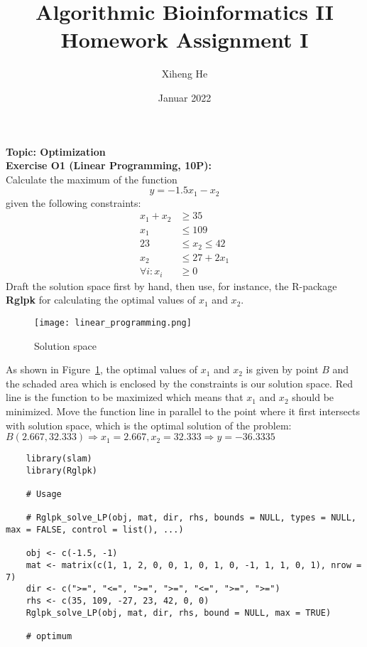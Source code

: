 \documentclass[12pt]{article}
\title{Algorithmic Bioinformatics II\\
Homework Assignment I}
\author{Xiheng He}
\date{Januar 2022}
\theoremstyle{definition}
\begin{document}
\maketitle
\begin{flushleft}
\textbf{Topic: Optimization} \\
\textbf{Exercise O1 (Linear Programming, 10P):} \\
Calculate the maximum of the function
\begin{equation*}
    y = -1.5x_1 - x_2
\end{equation*}
given the following constraints:
\begin{align}
        x_1 + x_2 & \geq 35 \\
        x_1 & \leq 109 \\
        23 & \leq x_2 \leq 42 \\
        x_2 & \leq 27 + 2x_1 \\
        \forall i : x_i &\geq 0
\end{align}
Draft the solution space first by hand, then use, for instance, the R-package \textbf{Rglpk}
for calculating the optimal values of $x_1$ and $x_2$.
\begin{figure}[H]
    \centering
    \texttt{[image: linear\_programming.png]}
    \caption{Solution space}
    \label{fig:linear_programming}
\end{figure}
As shown in Figure~\ref{fig:linear_programming}, the optimal values of $x_1$ and $x_2$ is given by point $B$
and the schaded area which is enclosed by the constraints is our solution space.
Red line is the function to be maximized which means that $x_1$ and $x_2$ should be minimized.
Move the function line in parallel to the point where it first intersects with solution space, 
which is the optimal solution of the problem: $B(2.667, 32.333) \Longrightarrow x_1 = 2.667, x_2 = 32.333 \Longrightarrow y = -36.3335$
\newpage
\begin{lstlisting}
    library(slam)
    library(Rglpk)
    
    # Usage 
    
    # Rglpk_solve_LP(obj, mat, dir, rhs, bounds = NULL, types = NULL, max = FALSE, control = list(), ...)
    
    obj <- c(-1.5, -1)
    mat <- matrix(c(1, 1, 2, 0, 0, 1, 0, 1, 0, -1, 1, 1, 0, 1), nrow = 7)
    dir <- c(">=", "<=", ">=", ">=", "<=", ">=", ">=")
    rhs <- c(35, 109, -27, 23, 42, 0, 0)
    Rglpk_solve_LP(obj, mat, dir, rhs, bound = NULL, max = TRUE)
    
    # optimum
    

\end{lstlisting}
\end{flushleft}
\end{document}
